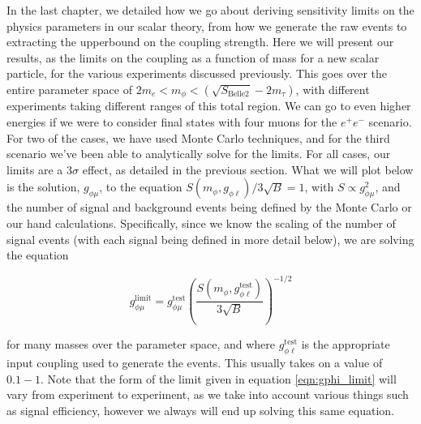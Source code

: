 \label{chapter:results}

In the last chapter, we detailed how we go about deriving sensitivity limits on the physics parameters in our scalar theory, from how we generate the raw events to extracting the upperbound on the coupling strength.
Here we will present our results, as the limits on the coupling as a function of mass for a new scalar particle, for the various experiments discussed previously.
This goes over the entire parameter space of $2m_e < m_\phi < (\sqrt{S_\textrm{Belle2}} - 2m_\tau)$, with different experiments taking different ranges of this total region.
We can go to even higher energies if we were to consider final states with four muons for the $e^+ e^-$ scenario.
For two of the cases, we have used \madgraph Monte Carlo techniques, and for the third scenario we've been able to analytically solve for the limits.
For all cases, our limits are a $3\sigma$ effect, as detailed in the previous section.
What we will plot below is the solution, $g_{\phi\mu}$, to the equation $S(m_\phi,g_{\phi\ell})/3\sqrt{B} = 1$, with $S \propto g_{\phi\mu}^2$, and the number of signal and background events being defined by the Monte Carlo or our hand calculations.
Specifically, since we know the scaling of the number of signal events (with each signal being defined in more detail below), we are solving the equation

\begin{equation}
\label{eqn:gphi_limit}
g_{\phi\mu}^\textrm{limit} = g_{\phi\mu}^\textrm{test} \left( \frac{S(m_\phi,g_{\phi\ell}^\textrm{test})}{3\sqrt{B}} \right)^{-1/2}
\end{equation}

\noindent for many masses over the parameter space, and where $g_{\phi\ell}^\textrm{test}$ is the appropriate input coupling used to generate the events.
This usually takes on a value of $0.1 - 1$.
Note that the form of the limit given in equation \ref{eqn:gphi_limit} will vary from experiment to experiment, as we take into account various things such as signal efficiency, however we always will end up solving this same equation.




